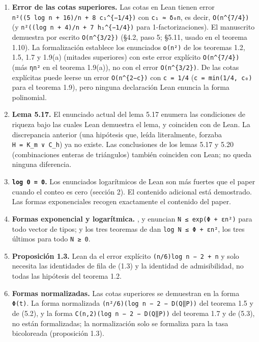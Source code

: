\documentclass[spanish,11pt,a4paper]{article}
\providecommand{\tightlist}{\setlength{\itemsep}{0pt}\setlength{\parskip}{0pt}}
\begin{document}
\begin{enumerate}
\def\labelenumi{\arabic{enumi}.}
\tightlist
\item
  \textbf{Error de las cotas superiores.} Las cotas en Lean tienen error \texttt{n²((5\ log\ n\ +\ 16)/n\ +\ 8\ c₁\^{}\{−1/4\})} con \texttt{c₁\ ≈\ δ₀n}, es decir, \texttt{O(n\^{}\{7/4\})} (y \texttt{n²((log\ n\ +\ 4)/n\ +\ 7\ h₁\^{}\{−1/4\})} para 1-factorizaciones). El manuscrito demuestra por escrito \texttt{O(n\^{}\{3/2\})} (§4.2, paso 5; §5.11, usado en el teorema 1.10). La formalización establece los enunciados \texttt{o(n²)} de los teoremas 1.2, 1.5, 1.7 y 1.9(a) (mitades superiores) con este error explícito \texttt{O(n\^{}\{7/4\})} (más \texttt{ηn²} en el teorema 1.9(a)), no con el error \texttt{O(n\^{}\{3/2\})}. De las cotas explícitas puede leerse un error \texttt{O(n\^{}\{2−c\})} con \texttt{c\ =\ 1/4} (\texttt{c\ =\ min(1/4,\ c₀)} para el teorema 1.9), pero ninguna declaración Lean enuncia la forma polinomial.
\item
  \textbf{Lema 5.17.} El enunciado actual del lema 5.17 enumera las condiciones de riqueza bajo las cuales Lean demuestra el lema, y coinciden con  de Lean. La discrepancia anterior (una hipótesis que, leída literalmente, forzaba \texttt{H\ =\ K\_m\ ∨\ C\_h}) ya no existe. Las conclusiones de los lemas 5.17 y 5.20 (combinaciones enteras de triángulos) también coinciden con Lean; no queda ninguna diferencia.
\item
  \textbf{\texttt{log\ 0\ =\ 0}.} Los enunciados logarítmicos de Lean son más fuertes que el paper cuando el conteo es cero (sección 2). El contenido adicional está demostrado. Las formas exponenciales recogen exactamente el contenido del paper.
\item
  \textbf{Formas exponencial y logarítmica.} ,  y  enuncian \texttt{N\ ≤\ exp(Φ\ +\ εn²)} para todo vector de tipos;  y los tres teoremas de  dan \texttt{log\ N\ ≤\ Φ\ +\ εn²}, los tres últimos para todo \texttt{N\ ≥\ 0}.
\item
  \textbf{Proposición 1.3.} Lean da el error explícito \texttt{(n/6)\textbar{}log\ n\ −\ 2\textbar{}\ +\ n} y solo necesita las identidades de fila de (1.3) y la identidad de admisibilidad, no todas las hipótesis del teorema 1.2.
\item
  \textbf{Formas normalizadas.} Las cotas superiores se demuestran en la forma \texttt{Φ(t)}. La forma normalizada \texttt{(n²/6)(log\ n\ −\ 2\ −\ D(Q‖P))} del teorema 1.5 y de (5.2), y la forma \texttt{C(n,2)(log\ n\ −\ 2\ −\ D(Q‖P))} del teorema 1.7 y de (5.3), no están formalizadas; la normalización solo se formaliza para la tasa bicoloreada (proposición 1.3).

\end{enumerate}
\end{document}
